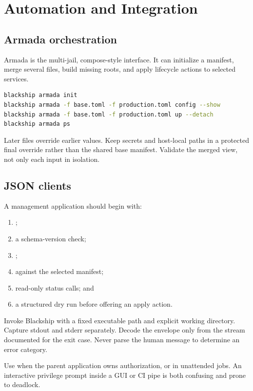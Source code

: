 \chapter{Automation and Integration}
\label{ch:automation}

\section{Armada orchestration}

Armada is the multi-jail, compose-style interface. It can initialize a
manifest, merge several files, build missing roots, and apply lifecycle actions
to selected services.

\begin{lstlisting}[language=bash]
blackship armada init
blackship armada -f base.toml -f production.toml config --show
blackship armada -f base.toml -f production.toml up --detach
blackship armada ps
\end{lstlisting}

Later files override earlier values. Keep secrets and host-local paths in a
protected final override rather than the shared base manifest. Validate the
merged view, not only each input in isolation.

\section{JSON clients}

A management application should begin with:

\begin{enumerate}
  \item {};
  \item a schema-version check;
  \item {};
  \item {} against the selected manifest;
  \item read-only status calls; and
  \item a structured dry run before offering an apply action.
\end{enumerate}

Invoke Blackship with a fixed executable path and explicit working directory.
Capture stdout and stderr separately. Decode the envelope only from the stream
documented for the exit case. Never parse the human message to determine an
error category.

Use  when the parent application owns authorization, or
 in unattended jobs. An interactive privilege prompt
inside a GUI or CI pipe is both confusing and prone to deadlock.

